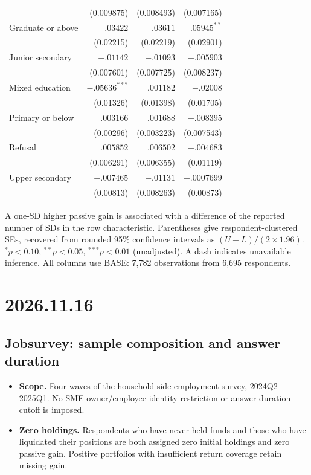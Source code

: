 \documentclass[11pt,letterpaper,english,final]{article}
\begin{document}
\begin{table}[H]
\begin{tabular}{lrrr}
 & (0.009875) & (0.008493) & (0.007165) \\[1pt]
Graduate or above & $.03422$ & $.03611$ & $.05945^{**}$ \\
 & (0.02215) & (0.02219) & (0.02901) \\[1pt]
Junior secondary & $-.01142$ & $-.01093$ & $-.005903$ \\
 & (0.007601) & (0.007725) & (0.008237) \\[1pt]
Mixed education & $-.05636^{***}$ & $.001182$ & $-.02008$ \\
 & (0.01326) & (0.01398) & (0.01705) \\[1pt]
Primary or below & $.003166$ & $.001688$ & $-.008395$ \\
 & (0.00296) & (0.003223) & (0.007543) \\[1pt]
Refusal & $.005852$ & $.006502$ & $-.004683$ \\
 & (0.006291) & (0.006355) & (0.01119) \\[1pt]
Upper secondary & $-.007465$ & $-.01131$ & $-.0007699$ \\
 & (0.00813) & (0.008263) & (0.00873) \\[1pt]
\bottomrule
\end{tabular}
\par\vspace{4pt}\begin{minipage}{\linewidth}\footnotesize A one-SD higher passive gain is associated with a difference of the reported number of SDs in the row characteristic. Parentheses give respondent-clustered SEs, recovered from rounded 95\% confidence intervals as $(U-L)/(2\times1.96)$. $^{*}p<0.10$, $^{**}p<0.05$, $^{***}p<0.01$ (unadjusted). A dash indicates unavailable inference. All columns use BASE: 7,782 observations from 6,695 respondents.\end{minipage}
\end{table}



\clearpage
\section{2026.11.16}
\setcounter{table}{0}
\setcounter{figure}{0}
\subsection{Jobsurvey: sample composition and answer duration}
\begin{itemize}[nosep]
\item \textbf{Scope.} Four waves of the household-side employment survey, 2024Q2--2025Q1. No SME owner/employee identity restriction or answer-duration cutoff is imposed.
\item \textbf{Zero holdings.} Respondents who have never held funds and those who have liquidated their positions are both assigned zero initial holdings and zero passive gain. Positive portfolios with insufficient return coverage retain missing gain.
\end{itemize}
\end{document}
